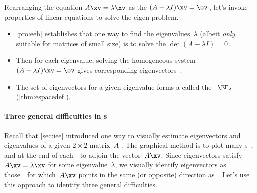 Rearranging the equation \(A\xv=\lambda\xv\) as the   \((A-\lambda I)\xv=\ov\)\,, let's invoke properties of linear equations to solve the eigen-problem.
\begin{itemize}
\item \cref{pro:eeh} establishes that one way to find the eigenvalues~\(\lambda\) (albeit \emph{only} suitable for matrices of small size) is to solve the  \(\det(A-\lambda I)=0\)\,. 
\item Then for each eigenvalue, solving the homogeneous system \((A-\lambda I)\xv=\ov\) gives corresponding eigenvectors~\xv. 
\item The set of eigenvectors for a given eigenvalue forms a  called the ~\(\EE_\lambda\) (\cref{thm:espacedef}).

\end{itemize}






\paragraph{Three general difficulties in s}
Recall that \cref{sec:iee} introduced one way to visually estimate eigenvectors and eigenvalues of a given \(2\times2\) matrix~\(A\) \cite[]{Schonefeld1995}. 
The graphical method is to plot many s~\xv, and at the end of each~\xv\ to adjoin the vector~\(A\xv\).
Since eigenvectors satisfy \(A\xv=\lambda\xv\) for some  eigenvalue~\(\lambda\), we visually identify eigenvectors as those~\xv\ for which~\(A\xv\) points in the same (or opposite) direction as~\xv.
Let's use this approach to identify three general difficulties.

